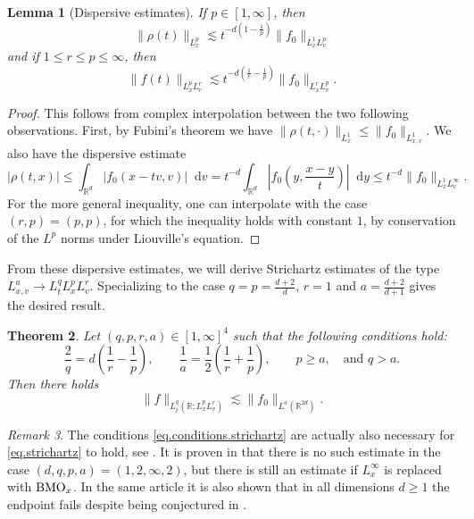 \documentclass[11pt,a4paper,reqno]{amsart}
\theoremstyle{plain}
\newtheorem{theorem}{Theorem}[section]
\newtheorem{lemma}[theorem]{Lemma}
\theoremstyle{remark}
\newtheorem{remark}[theorem]{Remark}
\newcommand{\dd}{\mathop{}\!\mathrm{d}}
\begin{document}
\begin{lemma}[Dispersive estimates] If $p\in[1,\infty]$, then  
\[
    \|\rho(t)\|_{L^p_x} \lesssim t^{-d(1-\frac{1}{p})}\|f_0\|_{L^1_xL^{p}_v}
\]
and if $1 \leq r \leq p \leq \infty$, then
\begin{equation}
    \label{disp}
    \|f(t)\|_{L^p_xL^r_v} \lesssim t^{-d\left(\frac{1}{r}-\frac{1}{p}\right)} \|f_0\|_{L^r_xL^p_v}.
\end{equation}
\end{lemma}

\begin{proof}
This follows from complex interpolation between the two following observations. First, by Fubini's theorem we have $\|\rho(t, \cdot)\|_{L^1_x} \leq \|f_0\|_{L^1_{x,v}}$. We also have the dispersive estimate
\[
    |\rho(t,x)| \leq \int_{\mathbb{R}^d} |f_0(x-tv,v)|\dd v = t^{-d}\int_{\mathbb{R}^d} \left|f_0\left(y,\frac{x-y}{t}\right)\right| \dd y \leq t^{-d}\|f_0\|_{L^1_xL^{\infty}_v}.
\]
For the more general inequality, one can interpolate with the case $(r,p)=(p,p)$, for which the inequality holds with constant $1$, by conservation of the $L^p$ norms under Liouville's equation. 
\end{proof}

From these dispersive estimates, we will derive Strichartz estimates of the type $L^a_{x,v} \to L^q_t L^p_x L^r_v$. Specializing to the case $q=p=\frac{d+2}{d}$, $r=1$ and $a = \frac{d+2}{d+1}$ gives the desired result.

\begin{theorem} \label{thm.stri}
Let $(q,p,r,a)\in[1,\infty]^4$ such that the following conditions hold: 
\begin{equation}
\label{eq.conditions.strichartz}
    \frac{2}{q}=d\left(\frac{1}{r}-\frac{1}{p}\right), \qquad \frac{1}{a}=\frac{1}{2}\left(\frac{1}{r}+\frac{1}{p}\right), \qquad p\geq a, \quad \text{and } q>a.
\end{equation}
Then there holds
\begin{equation}
\label{eq.strichartz}
    \|f\|_{L^q_t(\mathbb{R};L^p_xL^r_v)} \lesssim \|f_0\|_{L^a(\mathbb{R}^{2d})}. 
\end{equation}
\end{theorem}

\begin{remark}
The conditions \eqref{eq.conditions.strichartz} are actually also necessary  for \eqref{eq.strichartz} to hold, see \cite{keelTao1998}. It is proven in \cite{GuoPeng2007} that there is no such estimate in the case $(d,q,p,a)=(1,2,\infty,2)$, but there is still an estimate if $L^{\infty}_x$ is replaced with ${\rm BMO}_x$. In the same article it is also shown that in all dimensions $d\geq 1$ the endpoint fails despite being conjectured in \cite{keelTao1998}.
\end{remark}
\end{document}
